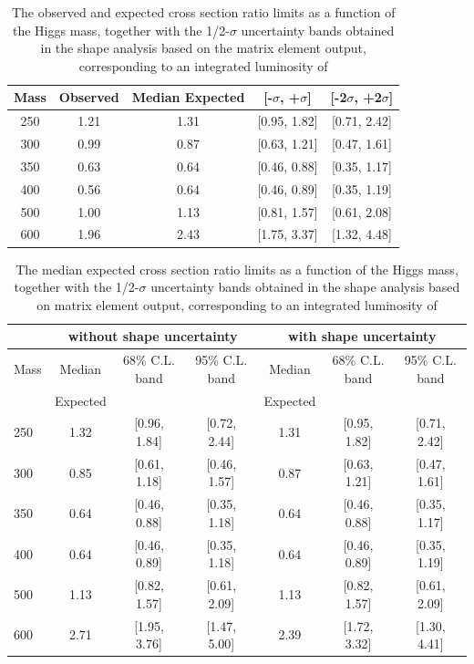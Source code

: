 \begin{table}[!ht]
\begin{center}
\begin{tabular}{ccccc}
\hline\hline
Mass & Observed & Median Expected & [-$\sigma$, +$\sigma$] & [-2$\sigma$, +2$\sigma$]\\\hline
250 & 1.21 & 1.31 & [0.95, 1.82] & [0.71, 2.42] \\
300 & 0.99 & 0.87 & [0.63, 1.21] & [0.47, 1.61] \\
350 & 0.63 & 0.64 & [0.46, 0.88] & [0.35, 1.17] \\
400 & 0.56 & 0.64 & [0.46, 0.89] & [0.35, 1.19] \\
500 & 1.00 & 1.13 & [0.81, 1.57] & [0.61, 2.08] \\
600 & 1.96 & 2.43 & [1.75, 3.37] & [1.32, 4.48] \\
\hline\hline
\end{tabular}
\end{center}
\caption{The observed and expected cross section ratio limits as a function 
of the Higgs mass, together with the 1/2-$\sigma$ uncertainty bands obtained in the shape analysis based on the matrix element output, 
corresponding to an integrated luminosity of \intlumi}
\label{tab:limits_meshape_5fb}
\end{table}


\begin{table}
\begin{center}
{\normalsize
\begin{tabular}{|l|c|c|c|c|c|c|}
\hline
      &  \multicolumn{3}{c|}{ without shape uncertainty} &\multicolumn{3}{c|}{ with shape uncertainty} \\
\hline
Mass  &  Median      &     68\% C.L. band &  95\% C.L. band &  Median	   &	 68\% C.L. band &  95\% C.L. band\\
      &  Expected    &                    &                 &  Expected    &			&		 \\
\hline
250 & 1.32 & [0.96, 1.84] & [0.72, 2.44] & 1.31 & [0.95, 1.82] & [0.71, 2.42] \\
300 & 0.85 & [0.61, 1.18] & [0.46, 1.57] & 0.87 & [0.63, 1.21] & [0.47, 1.61] \\
350 & 0.64 & [0.46, 0.88] & [0.35, 1.18] & 0.64 & [0.46, 0.88] & [0.35, 1.17] \\
400 & 0.64 & [0.46, 0.89] & [0.35, 1.18] & 0.64 & [0.46, 0.89] & [0.35, 1.19] \\
500 & 1.13 & [0.82, 1.57] & [0.61, 2.09] & 1.13 & [0.82, 1.57] & [0.61, 2.09] \\
600 & 2.71 & [1.95, 3.76] & [1.47, 5.00] & 2.39 & [1.72, 3.32] & [1.30, 4.41] \\
\hline
\end{tabular}
}
\end{center}
\caption{The median expected cross section ratio limits as a function 
of the Higgs mass, together with the 1/2-$\sigma$ uncertainty bands obtained in the shape analysis based on matrix element output, 
corresponding to an integrated luminosity of \intlumi}
\label{tab:limits_meshape_uncert_5fb}
\end{table}


